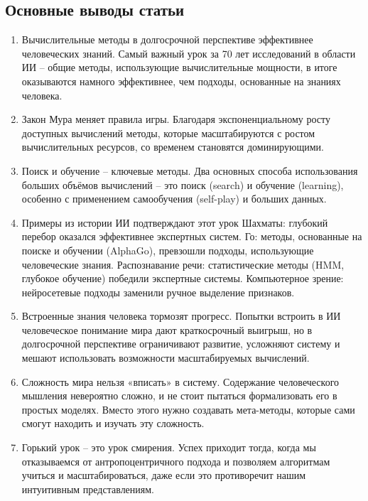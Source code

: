 \documentclass[a4paper, 14pt]{article}
\begin{document}
    \subsection{Основные выводы статьи}
    \begin{enumerate}
        
        \item Вычислительные методы в долгосрочной перспективе эффективнее человеческих знаний.
        Самый важный урок за 70 лет исследований в области ИИ -- общие методы, использующие вычислительные мощности, в
        итоге оказываются намного эффективнее, чем подходы, основанные на знаниях человека.
        
        \item Закон Мура меняет правила игры.
        Благодаря экспоненциальному росту доступных вычислений методы, которые масштабируются с ростом вычислительных
        ресурсов, со временем становятся доминирующими.
        
        \item Поиск и обучение -- ключевые методы.
        Два основных способа использования больших объёмов вычислений -- это поиск (search) и обучение (learning),
        особенно с применением самообучения (self-play) и больших данных.
        
        \item  Примеры из истории ИИ подтверждают этот урок
        \subitem Шахматы: глубокий перебор оказался эффективнее экспертных систем.
        \subitem Го: методы, основанные на поиске и обучении (AlphaGo), превзошли подходы, использующие человеческие
        знания.
        \subitem Распознавание речи: статистические методы (HMM, глубокое обучение) победили экспертные системы.
        \subitem Компьютерное зрение: нейросетевые подходы заменили ручное выделение признаков.
        
        \item Встроенные знания человека тормозят прогресс.
        Попытки встроить в ИИ человеческое понимание мира дают краткосрочный выигрыш, но в долгосрочной перспективе
        ограничивают развитие, усложняют систему и мешают использовать возможности масштабируемых вычислений.
        
        \item Сложность мира нельзя «вписать» в систему.
        Содержание человеческого мышления невероятно сложно, и не стоит пытаться формализовать его в простых моделях.
        Вместо этого нужно создавать мета-методы, которые сами смогут находить и изучать эту сложность.
        
        \item Горький урок -- это урок смирения.
        Успех приходит тогда, когда мы отказываемся от антропоцентричного подхода и позволяем алгоритмам учиться и
        масштабироваться, даже если это противоречит нашим интуитивным представлениям.
    
    \end{enumerate}
    
\end{document}
